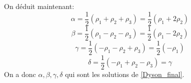 \documentclass[12pt]{article}
\begin{document}
On d\'eduit maintenant:
\begin{equation}
 \alpha = \frac{1}{2}(\rho_1 + \rho_2 + \rho_3) = \frac{1}{2}(\rho_1 + 2\rho_2)
\end{equation}
\begin{equation}
  \beta = \frac{1}{2}(\rho_1 - \rho_2 - \rho_3) = \frac{1}{2}(\rho_1 - 2\rho_2)
\end{equation}
\begin{equation}
 \gamma = \frac{1}{2}(-\rho_1 - \rho_2 + \rho_3) = \frac{1}{2}(-\rho_1)
\end{equation}
\begin{equation}
  \delta = \frac{1}{2}(-\rho_1 + \rho_2 - \rho_3) = \gamma
\end{equation}
On a donc $\alpha , \beta, \gamma,\delta$ qui sont les solutions de \ref{Dyson_final}.
\end{document}
